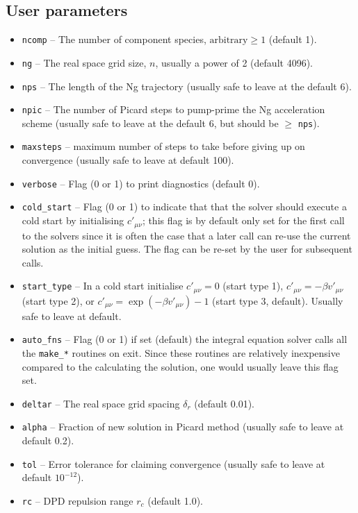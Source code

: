 \documentclass[12pt,a4paper]{article}
\begin{document}
\subsection{User parameters}
%
\begin{itemize}
%
\item\verb+ncomp+ -- The number of component species, $\text{arbitrary}\ge
  1$ (default 1).
%
\item\verb+ng+ -- The real space grid size, $n$, usually a power of 2
  (default 4096).
%
\item\verb+nps+ -- The length of the Ng trajectory (usually safe to
  leave at the default 6).
%
\item\verb+npic+ -- The number of Picard steps to pump-prime the Ng
  acceleration scheme (usually safe to leave at the default 6, but
  should be $\ge$ \verb+nps+).
%
\item\verb+maxsteps+ -- maximum number of steps to take before giving up on
convergence (usually safe to leave at default 100).
%
\item\verb+verbose+ -- Flag (0 or 1) to print diagnostics (default 0).
%
\item\verb+cold_start+ -- Flag (0 or 1) to indicate that that the
  solver should execute a cold start by initialising $c'_{\mu\nu}$;
  this flag is by default only set for the first call to the solvers
  since it is often the case that a later call can re-use the current
  solution as the initial guess.  The flag can be re-set by the user
  for subsequent calls.
%
\item\verb+start_type+ -- In a cold start initialise $c'_{\mu\nu}=0$
  (start type 1), $c'_{\mu\nu}=-\beta v'_{\mu\nu}$ (start type 2), or
  $c'_{\mu\nu}=\exp(-\beta v'_{\mu\nu})-1$ (start type 3, default).
  Usually safe to leave at default.
%
\item\verb+auto_fns+ -- Flag (0 or 1) if set (default) the integral
  equation solver calls all the \verb+make_*+ routines on exit.
  Since these routines are relatively inexpensive compared to the
  calculating the solution, one would usually leave this flag set.
%
\item\verb+deltar+ -- The real space grid spacing $\delta_r$ (default 0.01).
%
\item\verb+alpha+ -- Fraction of new solution in Picard method
  (usually safe to leave at default 0.2).
%
\item\verb+tol+ -- Error tolerance for claiming convergence (usually
  safe to leave at default $10^{-12}$).
%
\item\verb+rc+ -- DPD repulsion range $r_c$ (default 1.0).

\end{itemize}
\end{document}
